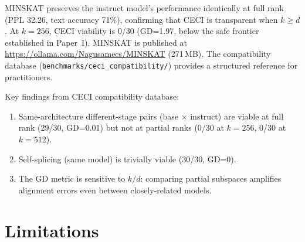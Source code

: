 \documentclass[11pt]{article}
\begin{document}
MINSKAT preserves the instruct model's performance identically at full rank
(PPL 32.26, text accuracy 71\%), confirming that CECI is transparent when
$k{\ge}d$.  At $k{=}256$, CECI viability is 0/30 (GD=1.97, below the safe
frontier established in Paper~I).  MINSKAT is published at
\url{https://ollama.com/Nagusamecs/MINSKAT} (271\,MB).  The compatibility
database (\texttt{benchmarks/ceci\_compatibility/}) provides a structured
reference for practitioners.

Key findings from CECI compatibility database:
\begin{enumerate}
\item Same-architecture different-stage pairs (base $\times$ instruct)
      are viable at full rank (29/30, GD=0.01) but not at partial ranks
      (0/30 at $k{=}256$, 0/30 at $k{=}512$).
\item Self-splicing (same model) is trivially viable (30/30, GD=0).
\item The GD metric is sensitive to $k/d$: comparing partial subspaces
      amplifies alignment errors even between closely-related models.
\end{enumerate}

\section{Limitations}
\label{sec:limits}
\end{document}
